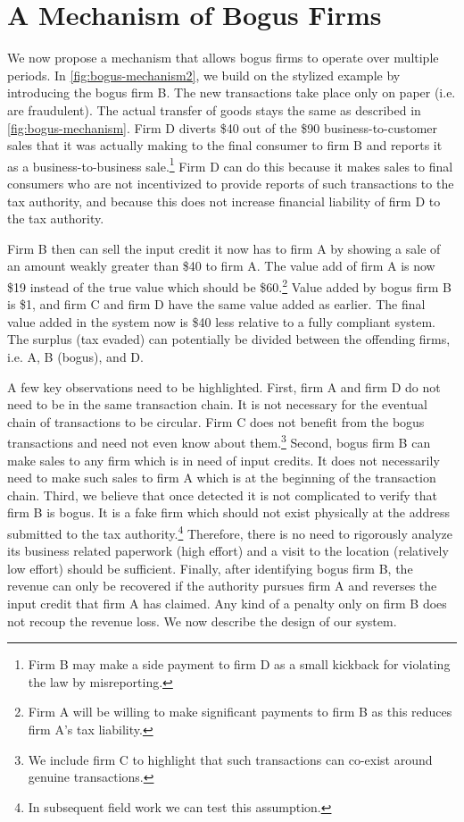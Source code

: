 \section{A Mechanism of Bogus Firms}
\label{sec:2-mechanism}
We now propose a mechanism that allows bogus firms to operate over multiple periods. In \cref{fig:bogus-mechanism2}, we build on the stylized example by introducing the bogus firm B. The new transactions take place only on paper (i.e. are fraudulent). The actual transfer of goods stays the same as described  in \cref{fig:bogus-mechanism}. Firm D diverts \$40 out of the \$90 business-to-customer sales that it was actually making to the final consumer to firm B and reports it as a business-to-business sale.\footnote{Firm B may make a side payment to firm D as a small kickback for violating the law by misreporting. }  Firm D can do this because it makes sales to final consumers who are not incentivized to provide reports of such transactions to the tax authority, and because this does not increase financial liability of firm D to the tax authority.  

Firm B then can sell the input credit it now has to firm A by showing a sale of an amount weakly greater than \$40 to firm A. The value add of firm A is now \$19 instead of the true value which should be \$60.\footnote{Firm A will be willing to make significant payments to firm B as this reduces firm A's tax liability.} Value added by bogus firm B is \$1, and firm C and firm D have the same value added as earlier. The final value added in the system now is \$40 less relative to a fully compliant system. The surplus (tax evaded) can potentially be divided between the offending firms, i.e. A, B (bogus), and D.

A few key observations need to be highlighted. First, firm A and firm D do not need to be in the same transaction chain. It is not necessary for the eventual chain of transactions to be circular. Firm C does not benefit from the bogus transactions and need not even know about them.\footnote{We include firm C to highlight that such transactions can co-exist around genuine transactions.} Second, bogus firm B can make sales to any firm which is in need of input credits. It does not necessarily need to make such sales to firm A which is at the beginning of the transaction chain. Third, we believe that once detected it is not complicated to verify that firm B is bogus. It is a fake firm which should not exist physically at the address submitted to the tax authority.\footnote{In subsequent field work we can test this assumption.} Therefore, there is no need to rigorously analyze its business related paperwork (high effort) and a visit to the location (relatively low effort) should be sufficient. Finally, after identifying bogus firm B, the revenue can only be recovered if the authority pursues firm A and reverses the input credit that firm A has claimed. Any kind of a penalty only on firm B does not recoup the revenue loss. We now describe the design of our system.

